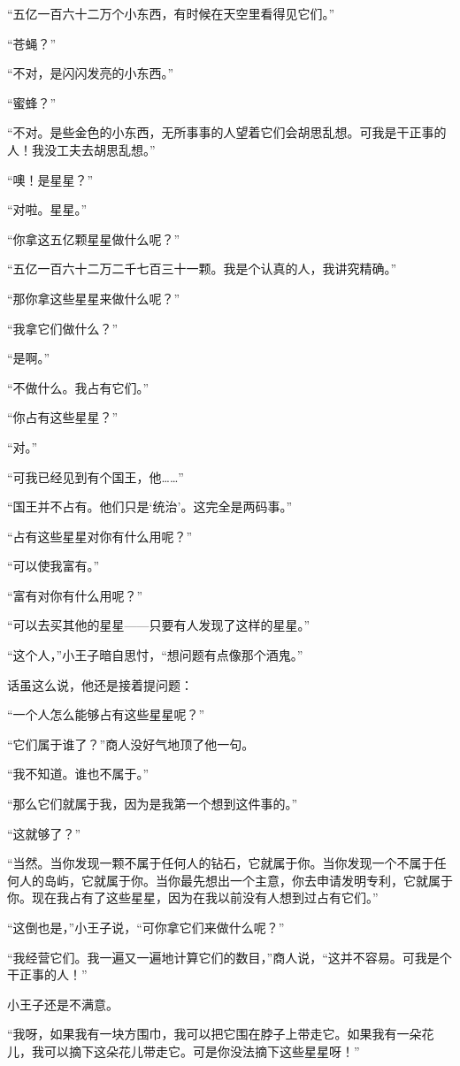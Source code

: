 “五亿一百六十二万个小东西，有时候在天空里看得见它们。”

“苍蝇？”

“不对，是闪闪发亮的小东西。”

“蜜蜂？”

“不对。是些金色的小东西，无所事事的人望着它们会胡思乱想。可我是干正事的人！我没工夫去胡思乱想。”

“噢！是星星？”

“对啦。星星。”

“你拿这五亿颗星星做什么呢？”

“五亿一百六十二万二千七百三十一颗。我是个认真的人，我讲究精确。”

“那你拿这些星星来做什么呢？”

“我拿它们做什么？”

“是啊。”

“不做什么。我占有它们。”

“你占有这些星星？”

“对。”

“可我已经见到有个国王，他\ldots{}\ldots{}”

“国王并不占有。他们只是‘统治'。这完全是两码事。”

“占有这些星星对你有什么用呢？”

“可以使我富有。”

“富有对你有什么用呢？”

“可以去买其他的星星------只要有人发现了这样的星星。”

“这个人，”小王子暗自思忖，“想问题有点像那个酒鬼。”

话虽这么说，他还是接着提问题：

“一个人怎么能够占有这些星星呢？”

“它们属于谁了？”商人没好气地顶了他一句。

“我不知道。谁也不属于。”

“那么它们就属于我，因为是我第一个想到这件事的。”

“这就够了？”

“当然。当你发现一颗不属于任何人的钻石，它就属于你。当你发现一个不属于任何人的岛屿，它就属于你。当你最先想出一个主意，你去申请发明专利，它就属于你。现在我占有了这些星星，因为在我以前没有人想到过占有它们。”

“这倒也是，”小王子说，“可你拿它们来做什么呢？”

“我经营它们。我一遍又一遍地计算它们的数目，”商人说，“这并不容易。可我是个干正事的人！”

小王子还是不满意。

“我呀，如果我有一块方围巾，我可以把它围在脖子上带走它。如果我有一朵花儿，我可以摘下这朵花儿带走它。可是你没法摘下这些星星呀！”

